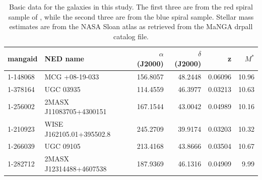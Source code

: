 \documentclass[modern]{aastex62}
\begin{document}
\begin{table}[h]
\centering
\begin{tabular}{llrrrr}
\hline
mangaid & NED name & $\alpha$ (J2000) & $\delta$ (J2000) & z & $M^*$ \\ 
\hline
1-148068 & MCG +08-19-033 & 156.8057 & 48.2448 & 0.06096 & 10.96 \\ 
1-378164 & UGC 03935 & 114.4559 & 46.3977 & 0.03213 & 10.63 \\ 
1-256002 & 2MASX J11083705+4300151 & 167.1544 & 43.0042 & 0.04989 & 10.16 \\ 
1-210923 & WISE J162105.01+395502.8 & 245.2709 & 39.9174 & 0.03203 & 10.32 \\ 
1-266039 & UGC 09105 & 213.4168 & 43.8666 & 0.03504 & 10.67 \\ 
1-282712 & 2MASX J12314488+4607538 & 187.9369 & 46.1316 & 0.04909 & 9.99 \\ 
\hline
\end{tabular}
\caption{Basic data for the galaxies in this study. The first three are from the red spiral sample of \citet{2010MNRAS.405..783M}, while the second three are from the blue spiral sample. Stellar mass estimates are from the NASA Sloan atlas as retrieved from the MaNGA drpall catalog file.}
\label{table:basedata}
\end{table}
\end{document}
